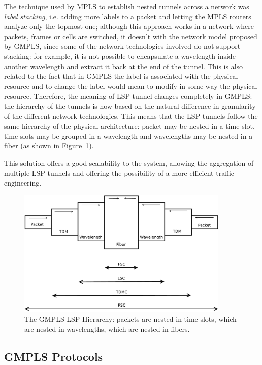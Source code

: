 \documentclass[10pt,a4paper]{report}
\begin{document}
The technique used by MPLS to establish nested tunnels across a
network was \textit{label stacking}, i.e. adding more labels to a
packet and letting the MPLS routers analyze only the topmost one;
although this approach works in a network where packets, frames or
cells are switched, it doesn't with the network model proposed by
GMPLS, since some of the network technologies involved do not support
stacking: for example, it is not possible to encapsulate a wavelength
inside another wavelength and extract it back at the end of the
tunnel. This is also related to the fact that in GMPLS the label is
associated with the physical resource and to change the label would
mean to modify in some way the physical resource. Therefore, the
meaning of LSP tunnel changes completely in GMPLS: the hierarchy of
the tunnels is now based on the natural difference in granularity of
the different network technologies. This means that the LSP tunnels
follow the same hierarchy of the physical architecture: packet may be
nested in a time-slot, time-slots may be grouped in a wavelength and
wavelengths may be nested in a fiber (as shown in
Figure~\ref{fig:gmpls_hierarchy}).

This solution offers a good scalability to the system, allowing the
aggregation of multiple LSP tunnels and offering the possibility of a
more efficient traffic engineering.

\begin{figure}[!htbp]
  \centering
  \includegraphics[width=0.9\textwidth]{img/gmpls_hierarchy}
  \caption[GMPLS LSP hierarchy]{The GMPLS LSP Hierarchy: packets are
    nested in time-slots, which are nested in wavelengths, which are
    nested in fibers.}
  \label{fig:gmpls_hierarchy}
\end{figure}

\subsection{GMPLS Protocols}
\end{document}
